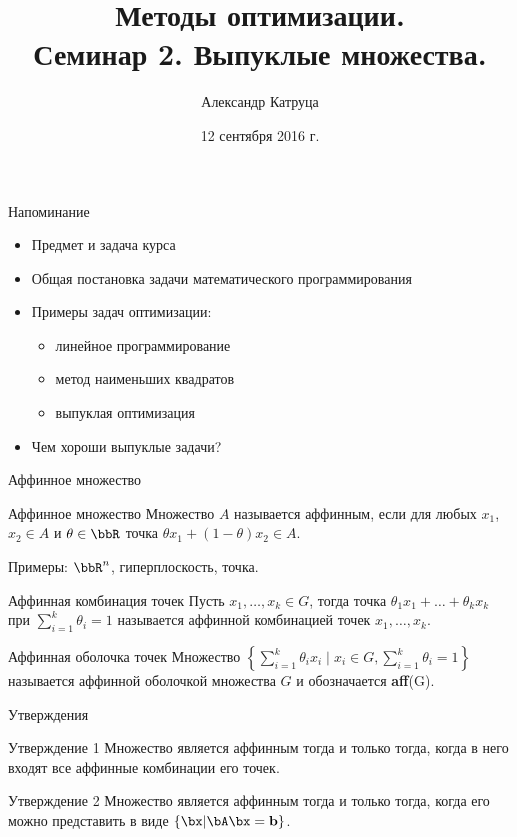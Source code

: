 \documentclass[12pt,russian]{beamer}
\title[Семинар 2]{Методы оптимизации. \\
Семинар 2. Выпуклые множества.}
\author{Александр Катруца}
\institute{Московский физико-технический институт,\\
Факультет Управления и Прикладной Математики}
\date{12 сентября 2016 г.}
\begin{document}
\begin{frame}
\maketitle
\end{frame}

\begin{frame}{Напоминание}

\begin{itemize}
\item Предмет и задача курса
\item Общая постановка задачи математического программирования
\item Примеры задач оптимизации: 
\begin{itemize}
\item линейное программирование
\item метод наименьших квадратов
\item выпуклая оптимизация
\end{itemize}
\item Чем хороши выпуклые задачи?
\end{itemize}
\end{frame}

\begin{frame}{Аффинное множество}
\small
\begin{block}{Аффинное множество}
Множество $A$ называется аффинным, если для любых $x_1$, $x_2 \in A$ и $\theta \in \bbR$ точка $\theta x_1 + (1 - \theta)x_2 \in A$.
\end{block}
Примеры: $\bbR^n$, гиперплоскость, точка.
\begin{block}{Аффинная комбинация точек}
Пусть $x_1, \ldots, x_k \in G$, тогда точка $\theta_1 x_1 + \ldots + \theta_k x_k$ при $\sum\limits_{i=1}^k \theta_i = 1$ называется аффинной комбинацией точек $x_1,\ldots,x_k$.
\end{block}

\begin{block}{Аффинная оболочка точек}
Множество $\left\{ \sum\limits_{i=1}^k \theta_i x_i \; | \; x_i \in G, \sum\limits_{i=1}^k \theta_i = 1 \right\}$ называется аффинной оболочкой множества $G$ и обозначается \textbf{aff}(G).
\end{block}
\end{frame}

\begin{frame}{Утверждения}

\begin{block}{Утверждение 1}
Множество является аффинным тогда и только тогда, когда в него входят все аффинные комбинации его точек.
\end{block}

\begin{block}{Утверждение 2}
Множество является аффинным тогда и только тогда, когда его можно представить в виде $\{\bx | \bA\bx = \mathbf{b} \}$.
\end{block}
\end{frame}
\end{document}
